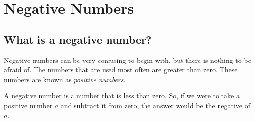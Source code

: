     \section{Negative Numbers}
            \nopagebreak
      \label{m38346*uid20}
            \subsection{ What is a negative number?}
            \nopagebreak
        \label{m38346*id173795}Negative numbers can be very confusing to begin with, but there is nothing to be
afraid of. The numbers that are used most often are greater than zero. These
numbers are known as \textsl{positive numbers}.\par 
        \label{m38346*id173805}A negative number is a number that is less than zero. So, if we were to
take a positive number $a$ and subtract it from zero, the answer would be the
negative of $a$.\par 
        \label{m38346*id173828}\nopagebreak\noindent{}
